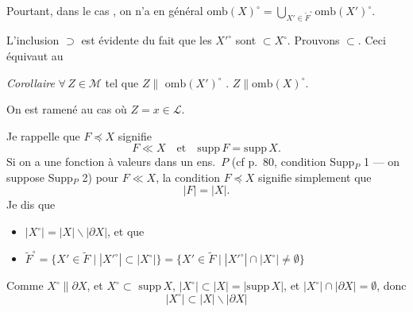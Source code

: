 \documentclass[11pt,a4paper]{article}
\begin{document}
Pourtant, dans le cas , on n'a  en général \ill{} $\mathrm{omb}(X)^{\circ} = \bigcup_{X' \in \widetilde{F}^{\circ}} \mathrm{omb}(X')^{\circ}$.

 L'inclusion $\supset$ est évidente du fait que les $X'^{\circ}$ sont $\subset X^{\circ}$. Prouvons $\subset$.  Ceci équivaut au

\emph{Corollaire} $\forall\, Z \in \mathcal{M}$ tel que  $Z \parallel{}$  $\mathrm{omb}(X')^{\circ}$ .   $Z \parallel \mathrm{omb}(X)^{\circ}$.

  On est ramené au cas où $Z = x \in \mathcal{L}$.

Je rappelle que $F \preccurlyeq X$ signifie
\[
  F \ll X \quad \text{et} \quad \mathrm{supp}\, F = \mathrm{supp}\, X .
\]
Si on a une fonction   à valeurs dans un ens.\ $P$ (cf p.~80, condition Supp$_P$ 1 — on suppose Supp$_P$ 2)  pour $F \ll X$, \ill{} \ill{} \ill{} la condition $F \preccurlyeq X$ signifie simplement que
\[
  |F| = |X| .
\]
Je dis que
\begin{itemize}
  \item[(a)] $|X^{\circ}| = |X| \smallsetminus |\partial X|$, et que
  \item[(b)] $\widetilde{F}^{\circ} = \lbrace X' \in \widetilde{F} \mid |X'^{\circ}| \subset |X^{\circ}| \rbrace = \lbrace X' \in \widetilde{F} \mid |X'^{\circ}| \cap |X^{\circ}| \neq \emptyset \rbrace$
\end{itemize}

Comme $X^{\circ} \parallel \partial X$, \struck{\ill{}} et $X^{\circ} \subset{}$  $\mathrm{supp}\, X$, $|X^{\circ}| \subset |X| = |\mathrm{supp}\, X|$, et $|X^{\circ}| \cap |\partial X| = \emptyset$, donc
\[
  |X^{\circ}| \subset |X| \smallsetminus |\partial X|
\]
\end{document}
